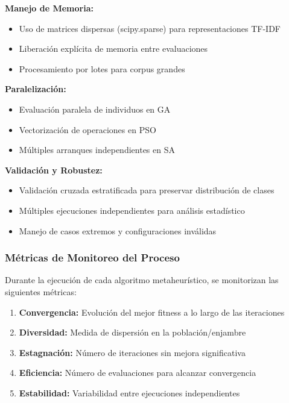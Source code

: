 \textbf{Manejo de Memoria:}
\begin{itemize}
    \item Uso de matrices dispersas (scipy.sparse) para representaciones TF-IDF
    \item Liberación explícita de memoria entre evaluaciones
    \item Procesamiento por lotes para corpus grandes
\end{itemize}

\textbf{Paralelización:}
\begin{itemize}
    \item Evaluación paralela de individuos en GA
    \item Vectorización de operaciones en PSO
    \item Múltiples arranques independientes en SA
\end{itemize}

\textbf{Validación y Robustez:}
\begin{itemize}
    \item Validación cruzada estratificada para preservar distribución de clases
    \item Múltiples ejecuciones independientes para análisis estadístico
    \item Manejo de casos extremos y configuraciones inválidas
\end{itemize}

\subsubsection{Métricas de Monitoreo del Proceso}

Durante la ejecución de cada algoritmo metaheurístico, se monitorizan las siguientes métricas:

\begin{enumerate}
    \item \textbf{Convergencia:} Evolución del mejor fitness a lo largo de las iteraciones
    \item \textbf{Diversidad:} Medida de dispersión en la población/enjambre
    \item \textbf{Estagnación:} Número de iteraciones sin mejora significativa
    \item \textbf{Eficiencia:} Número de evaluaciones para alcanzar convergencia
    \item \textbf{Estabilidad:} Variabilidad entre ejecuciones independientes
\end{enumerate}


